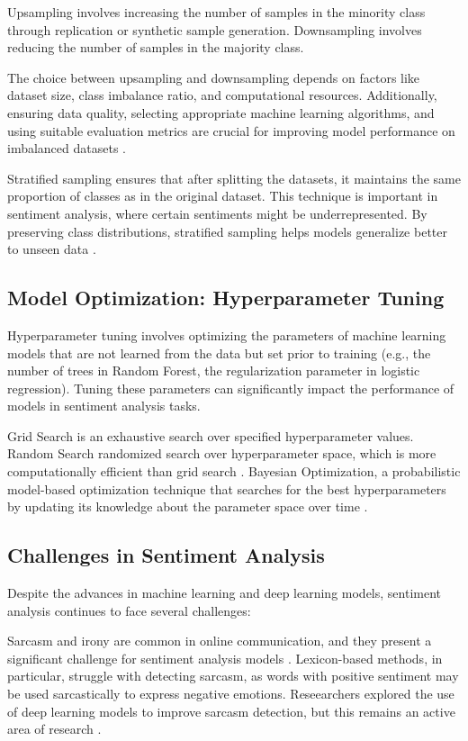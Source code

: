 Upsampling involves increasing the number of samples in the minority class through replication or synthetic sample generation. Downsampling involves reducing the number of samples in the majority class.

The choice between upsampling and downsampling depends on factors like dataset size, class imbalance ratio, and computational resources. Additionally, ensuring data quality, selecting appropriate machine learning algorithms, and using suitable evaluation metrics are crucial for improving model performance on imbalanced datasets \cite{analyticsvidhya2024}.

Stratified sampling ensures that after splitting the datasets, it maintains the same proportion of classes as in the original dataset. This technique is important in sentiment analysis, where certain sentiments might be underrepresented. By preserving class distributions, stratified sampling helps models generalize better to unseen data \cite{shi2015}.

\subsection{Model Optimization: Hyperparameter Tuning}

Hyperparameter tuning involves optimizing the parameters of machine learning models that are not learned from the data but set prior to training (e.g., the number of trees in Random Forest, the regularization parameter in logistic regression). Tuning these parameters can significantly impact the performance of models in sentiment analysis tasks.

Grid Search is an exhaustive search over specified hyperparameter values.
Random Search randomized search over hyperparameter space, which is more computationally efficient than grid search \cite{chawla2024}.
Bayesian Optimization, a probabilistic model-based optimization technique that searches for the best hyperparameters by updating its knowledge about the parameter space over time \cite{chawla20241}.

\subsection{Challenges in Sentiment Analysis}

Despite the advances in machine learning and deep learning models, sentiment analysis continues to face several challenges:

Sarcasm and irony are common in online communication, and they present a significant challenge for sentiment analysis models \cite{Meriem2021}. Lexicon-based methods, in particular, struggle with detecting sarcasm, as words with positive sentiment may be used sarcastically to express negative emotions. Reseearchers explored the use of deep learning models to improve sarcasm detection, but this remains an active area of research \cite{Pozzi2017}.

